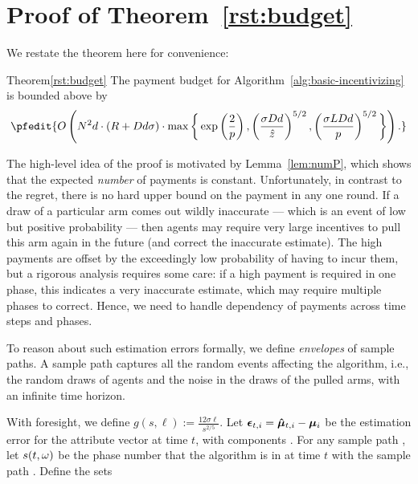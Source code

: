 \section{Proof of Theorem~\ref{rst:budget}}
\label{sec:payment-proof}

We restate the theorem here for convenience:

\begin{rtheorem}{Theorem}{\ref{rst:budget}}
The payment budget for Algorithm~\ref{alg:basic-incentivizing} is bounded above by 
\begin{align}
\pfedit{O \left(\ARMNUM^2  d \cdot (\MAXR + \Diam d \sigma)\cdot \max\bigg\{\exp\left(\frac{2}{p}\right),
\left( \frac{\sigma \Diam d}{\TieCutoff} \right)^{5/2},
\left( \frac{\sigma \TieDensity \Diam d}{\MinProb} \right)^{5/2}\bigg\}
\right).}\nonumber 
\end{align}
\end{rtheorem}

The high-level idea of the proof is motivated by Lemma~\ref{lem:numP},
which shows that the expected \emph{number} of payments is constant.
Unfortunately, in contrast to the regret, there is no hard upper bound
on the payment in any one round.
If a draw of a particular arm comes out wildly inaccurate --- which is
an event of low but positive probability ---
then agents may require very large incentives to pull this arm again
in the future (and correct the inaccurate estimate).
The high payments are offset by the exceedingly low probability of
having to incur them, but a rigorous analysis requires some care:
if a high payment is required in one phase, this indicates a very
inaccurate estimate, which may require multiple phases to correct.
Hence, we need to handle dependency of payments across time steps and
phases.

To reason about such estimation errors formally, we define
\emph{envelopes} of sample paths.
A sample path \SP captures all the random events affecting the
algorithm, i.e., the random draws  of agents and the
noise \NoiseV[t] in the draws of the pulled arms,
with an infinite time horizon.

With foresight, we define $g(s, \ell) := \frac{12 \sigma \ell}{s^{2/5}}$.
Let $\bm{\epsilon}_{t,i} = \bm{\hat{\mu}}_{t,i} - \bm{\mu}_{i}$ be the estimation
error for the attribute vector  at time $t$,
with components .
For any sample path \SP, let $s (t,\omega)$ be the phase number that the
algorithm is in at time $t$ with the sample path \SP.
Define the sets

